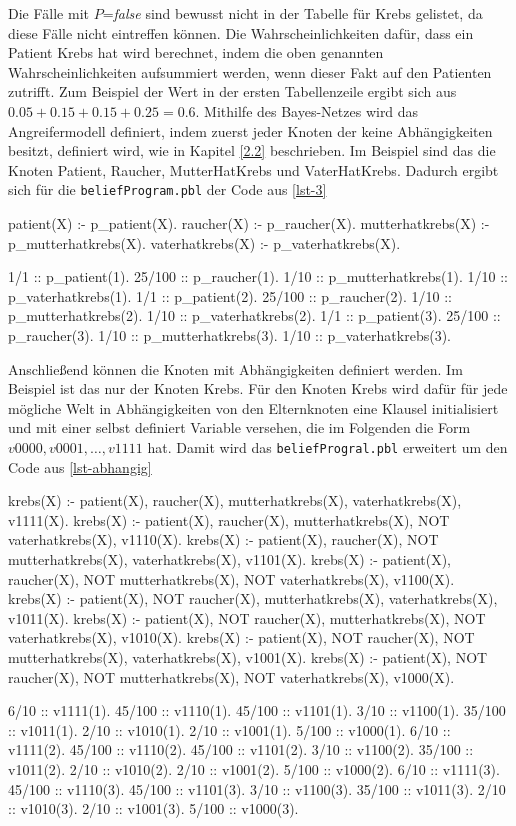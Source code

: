 \documentclass[german,version-2020-11]{uzl-thesis}
\begin{document}
Die Fälle mit $P$=\textit{false} sind bewusst nicht in der Tabelle für Krebs gelistet, da diese Fälle nicht eintreffen können. Die Wahrscheinlichkeiten dafür, dass ein Patient Krebs hat wird berechnet, indem die oben genannten Wahrscheinlichkeiten aufsummiert werden, wenn dieser Fakt auf den Patienten zutrifft. Zum Beispiel der Wert in der ersten Tabellenzeile ergibt sich aus $0.05 + 0.15 + 0.15 +0.25 = 0.6$.
Mithilfe des Bayes-Netzes wird das Angreifermodell definiert, indem zuerst jeder Knoten der keine Abhängigkeiten besitzt, definiert wird, wie in Kapitel \cref{2.2} beschrieben. Im Beispiel sind das die Knoten Patient, Raucher, MutterHatKrebs und VaterHatKrebs. Dadurch ergibt sich für die \texttt{beliefProgram.pbl} der Code aus \autoref{lst-3}
\begin{Pseudocode}[caption={Beispiel für Knoten ohne Abhängigkeiten }, label={lst-3}, numbers=left]
patient(X) :- p_patient(X).
raucher(X) :- p_raucher(X).
mutterhatkrebs(X) :- p_mutterhatkrebs(X).
vaterhatkrebs(X) :- p_vaterhatkrebs(X).
	
1/1 :: p_patient(1).
25/100 :: p_raucher(1).
1/10 :: p_mutterhatkrebs(1).
1/10 :: p_vaterhatkrebs(1).
1/1 :: p_patient(2).
25/100 :: p_raucher(2).
1/10 :: p_mutterhatkrebs(2).
1/10 :: p_vaterhatkrebs(2).
1/1 :: p_patient(3).
25/100 :: p_raucher(3).
1/10 :: p_mutterhatkrebs(3).
1/10 :: p_vaterhatkrebs(3).
\end{Pseudocode}
Anschließend können die Knoten mit Abhängigkeiten definiert werden. Im Beispiel ist das nur der Knoten Krebs. Für den Knoten Krebs wird dafür für jede mögliche Welt in Abhängigkeiten von den Elternknoten eine Klausel initialisiert und mit einer selbst definiert Variable versehen, die im Folgenden die Form $v0000, v0001, \dots , v1111$ hat. Damit wird das \texttt{beliefProgral.pbl} erweitert um den Code aus \autoref{lst-abhangig} 
\begin{Pseudocode}[caption={Beispiel für Knoten mit Abhängigkeiten }, label={lst-abhangig}, numbers=left]
krebs(X) :- patient(X), raucher(X), mutterhatkrebs(X), vaterhatkrebs(X), v1111(X).
krebs(X) :- patient(X), raucher(X), mutterhatkrebs(X), NOT vaterhatkrebs(X), v1110(X).
krebs(X) :- patient(X), raucher(X), NOT mutterhatkrebs(X), vaterhatkrebs(X), v1101(X).
krebs(X) :- patient(X), raucher(X), NOT mutterhatkrebs(X), NOT vaterhatkrebs(X), v1100(X).
krebs(X) :- patient(X), NOT raucher(X), mutterhatkrebs(X), vaterhatkrebs(X), v1011(X).
krebs(X) :- patient(X), NOT raucher(X), mutterhatkrebs(X), NOT vaterhatkrebs(X), v1010(X).
krebs(X) :- patient(X), NOT raucher(X), NOT mutterhatkrebs(X), vaterhatkrebs(X), v1001(X).
krebs(X) :- patient(X), NOT raucher(X), NOT mutterhatkrebs(X), NOT vaterhatkrebs(X), v1000(X).

6/10 :: v1111(1).
45/100 :: v1110(1).
45/100 :: v1101(1).
3/10 :: v1100(1).
35/100 :: v1011(1).
2/10 :: v1010(1).
2/10 :: v1001(1).
5/100 :: v1000(1).
6/10 :: v1111(2).
45/100 :: v1110(2).
45/100 :: v1101(2).
3/10 :: v1100(2).
35/100 :: v1011(2).
2/10 :: v1010(2).
2/10 :: v1001(2).
5/100 :: v1000(2).
6/10 :: v1111(3).
45/100 :: v1110(3).
45/100 :: v1101(3).
3/10 :: v1100(3).
35/100 :: v1011(3).
2/10 :: v1010(3).
2/10 :: v1001(3).
5/100 :: v1000(3).
\end{Pseudocode}
\end{document}
